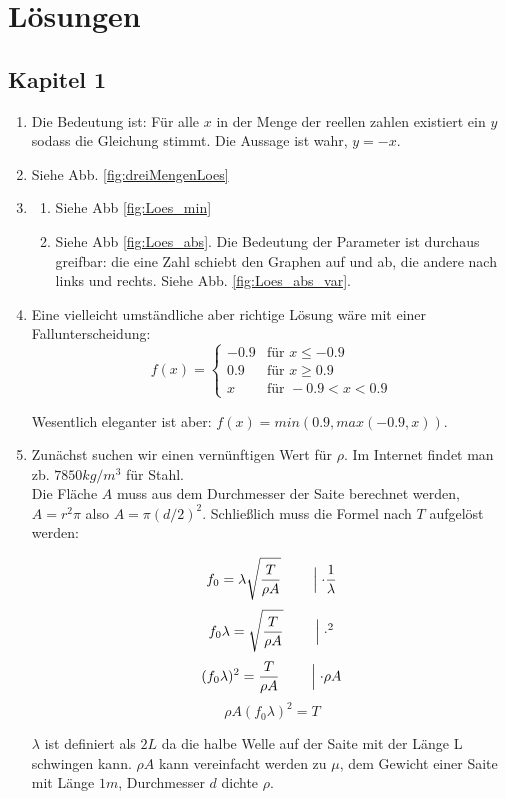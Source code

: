 \chapter{Lösungen}

\section{Kapitel 1}
\begin{enumerate}
	\item Die Bedeutung ist: Für alle $x$ in der Menge der reellen zahlen existiert ein $y$ sodass die Gleichung stimmt. Die Aussage ist wahr, $y = -x$.
    \item Siehe Abb. \ref{fig:dreiMengenLoes}
    \item 
    \begin{enumerate}
\item Siehe Abb \ref{fig:Loes_min}
\item Siehe Abb \ref{fig:Loes_abs}. Die Bedeutung der Parameter ist durchaus greifbar: die eine Zahl schiebt den Graphen auf und ab, die andere nach links und rechts. Siehe Abb. \ref{fig:Loes_abs_var}.
    \end{enumerate}

\item Eine vielleicht umständliche aber richtige Lösung wäre mit einer Fallunterscheidung:
$$ f(x) = \begin{cases} 
-0.9 & \text{für } x \leq -0.9 \\ 
0.9 & \text{für } x \geq 0.9 \\
x & \text{für }  -0.9 < x < 0.9
\end{cases}$$

Wesentlich eleganter ist aber: $f(x) = min(0.9, max(-0.9, x))$.

\item Zunächst suchen wir einen vernünftigen Wert für $\rho$. Im Internet findet man zb. $7850 kg/m^3$ für Stahl. \\
Die Fläche $A$ muss aus dem Durchmesser der Saite berechnet werden, $A = r^2 \pi$ also $A = \pi (d/2)^2$.  
Schließlich muss die Formel nach $T$ aufgelöst werden:

$$ f_0 = \lambda \sqrt{\frac{T}{\rho A}} \qquad  \Bigm\lvert \cdot \frac{1}{\lambda}$$ 
$$ f_0 \lambda =  \sqrt{\frac{T}{\rho A}} \qquad \Bigm\lvert  \cdot ^2$$
$$ (f_0 \lambda)^2 =  \frac{T}{\rho A} \qquad \Bigm\lvert \cdot \rho A$$
$$ \rho A (f_0 \lambda)^2 =  T $$ 

$\lambda$ ist definiert als $2L$ da die halbe Welle auf der Saite mit der Länge L schwingen kann. $\rho A$ kann vereinfacht werden zu $\mu$, dem Gewicht einer Saite mit Länge $1m$, Durchmesser $d$ dichte $\rho$.


\end{enumerate}
